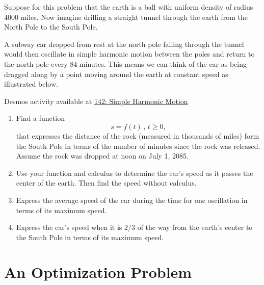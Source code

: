 \documentclass{ximera}
\begin{document}
\begin{question}  \label{QKLKLggggghg}
Suppose for this problem that the earth is a ball with uniform density of radius 4000 miles. Now imagine drilling a straight tunnel through the earth from the North Pole to the South Pole. 

A subway car dropped from rest at the north pole falling through the tunnel would then oscillate in simple harmonic motion between the poles and return to the north pole every $84$ minutes. This means we can think of the car as being dragged along by a point moving around the earth at constant speed as illustrated below. 

\begin{onlineOnly}
    \begin{center}
\end{center}
\end{onlineOnly}

Desmos activity available at \href{https://www.desmos.com/calculator/ij8dqowgza}{142: Simple Harmonic Motion}

\begin{enumerate}

\item Find a function 
\[
      s = f(t) \, , \, t\geq 0,
\]
that expresses the distance of the rock (measured in thousands of miles) form the South Pole in terms of the number of minutes since the rock was released. Assume the rock was dropped at noon on July 1, 2085.

\item Use your function and calculus to determine the car's speed as it passes the center of the earth. Then find the speed without calculus.

\item Express the average speed of the car during the time for one oscillation in terms of its maximum speed.

\item Express the car's speed when it is $2/3$ of the way from the earth's center to the South Pole in terms of its maximum speed.


\end{enumerate}

\end{question}

\section{An Optimization Problem}
\end{document}
